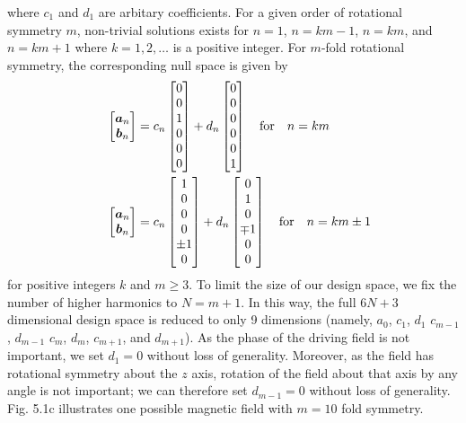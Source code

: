 where $c_1$ and $d_1$ are arbitary coefficients. For a given order of rotational symmetry $m$, non-trivial solutions exists for $n=1$, $n=k m-1$, $n=k m$, and $n=k m + 1$  where $k= 1,2,\dots$ is a positive integer. For $m$-fold rotational symmetry, the corresponding null space is given by
\begin{align}
    \quad \begin{bmatrix} \boldsymbol{a}_{n} \\ \boldsymbol{b}_{n} \end{bmatrix} &= c_{n} \begin{bmatrix} 0\\0\\1\\0\\0\\0 \end{bmatrix} + d_{n} \begin{bmatrix} 0\\0\\0\\0\\0\\1 \end{bmatrix} \quad \text{for} \quad n=km
    \\
    \quad \begin{bmatrix} \boldsymbol{a}_{n} \\ \boldsymbol{b}_{n} \end{bmatrix} &= c_{n} \begin{bmatrix} 1\\0\\0\\0\\\pm1\\0 \end{bmatrix} + d_{n} \begin{bmatrix} 0\\1\\0\\\mp1\\0\\0 \end{bmatrix} \quad \text{for} \quad n=km \pm 1
\end{align}
for positive integers $k$ and $m\geq3$. To limit the size of our design space, we fix the number of higher harmonics to $N=m+1$. In this way, the full $6N+3$ dimensional design space is reduced to only 9 dimensions (namely, $a_0$, $c_1$, $d_1$ $c_{m-1}$, $d_{m-1}$ $c_{m}$, $d_{m}$, $c_{m+1}$, and $d_{m+1}$). As the phase of the driving field is not important, we set $d_1=0$ without loss of generality.  Moreover, as the field has rotational symmetry about the $z$ axis, rotation of the field about that axis by any angle is not important; we can therefore set $d_{m-1}=0$ without loss of generality.  Fig. 5.1c illustrates one possible magnetic field with $m=10$ fold symmetry.

